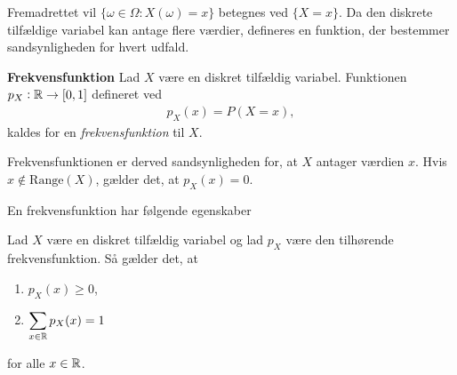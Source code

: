 Fremadrettet vil $\{\omega\in \Omega: X(\omega)=x\}$ betegnes ved $\{X=x\}$. Da den diskrete tilfældige variabel kan antage flere værdier, defineres en funktion, der bestemmer sandsynligheden for hvert udfald.

\begin{minipage}\textwidth
\begin{defn}\label{def:Frekvensfunktionen}\textbf{Frekvensfunktion} %
\newline
    Lad $X$ være en diskret tilfældig variabel. %
    Funktionen $p_X:\mathbb{R}\to [0,1]$ defineret ved
%    
\begin{align}\label{eq:p_x}
    p_X(x) = P(X = x),
\end{align}
%    
    kaldes for en \textit{frekvensfunktion} til $X$.
\end{defn}
\end{minipage}

Frekvensfunktionen er derved sandsynligheden for, at $X$ antager værdien $x$. Hvis $x\not\in \text{Range}(X)$, gælder det, at $p_X(x) = 0$.  

En frekvensfunktion har følgende egenskaber
\begin{pro}\label{prop:frekvensfunktion}\textbf{}
\newline
    Lad $X$ være en diskret tilfældig variabel og lad $p_X$ være den tilhørende frekvensfunktion. Så gælder det, at
    \begin{enumerate}
        \item $\displaystyle p_X(x)\geq 0$,
        \item $\displaystyle \sum_{x\in \mathbb{R}} p_X(x)=1$
    \end{enumerate}
    for alle $x\in \mathbb{R}$.
\end{pro}


